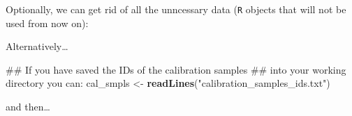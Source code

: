 \documentclass[]{book}
\newenvironment{Shaded}{\begin{snugshade}}{\end{snugshade}}
\newcommand{\DataTypeTok}[1]{\textcolor[rgb]{0.13,0.29,0.53}{#1}}
\newcommand{\KeywordTok}[1]{\textcolor[rgb]{0.13,0.29,0.53}{\textbf{#1}}}
\newcommand{\NormalTok}[1]{#1}
\newcommand{\OperatorTok}[1]{\textcolor[rgb]{0.81,0.36,0.00}{\textbf{#1}}}
\newcommand{\StringTok}[1]{\textcolor[rgb]{0.31,0.60,0.02}{#1}}
\begin{document}
Optionally, we can get rid of all the unncessary data (\texttt{R} objects that will not be used from now on):

\begin{Shaded}
\end{Shaded}

Alternatively\ldots{}

\begin{Shaded}
\begin{Highlighting}[]
\NormalTok{## If you have saved the IDs of the calibration samples }
\NormalTok{## into your working directory you can:}
\NormalTok{cal_smpls <-}\StringTok{ }\KeywordTok{readLines}\NormalTok{(}\StringTok{"calibration_samples_ids.txt"}\NormalTok{)}
\end{Highlighting}
\end{Shaded}

and then\ldots{}
\end{document}

